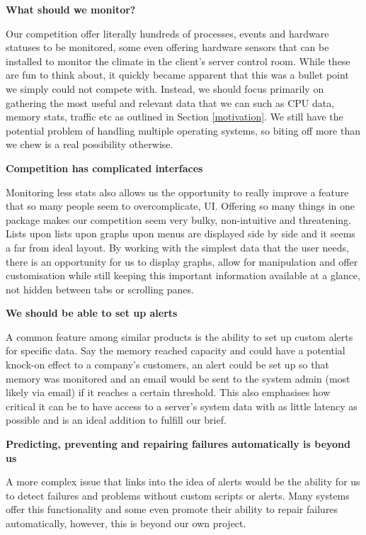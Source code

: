 \documentclass{l3proj}
\begin{document}
\textbf{What should we monitor?}

Our competition offer literally hundreds of processes, events and hardware statuses to be monitored, some even offering hardware sensors that can be installed to monitor the climate in the client's server control room. While these are fun to think about, it quickly became apparent that this was a bullet point we simply could not compete with. Instead, we should focus primarily on gathering the most useful and relevant data that we can such as CPU data, memory stats, traffic etc as outlined in Section \ref{motivation}. We still have the potential problem of handling multiple operating systems, so biting off more than we chew is a real possibility otherwise.

\textbf{Competition has complicated interfaces}

Monitoring less stats also allows us the opportunity to really improve a feature that so many people seem to overcomplicate, UI. Offering so many things in one package makes our competition seem very bulky, non-intuitive and threatening. Lists upon lists upon graphs upon menus are displayed side by side and it seems a far from ideal layout. By working with the simplest data that the user needs, there is an opportunity for us to display graphs, allow for manipulation and offer customisation while still keeping this important information available at a glance, not hidden between tabs or scrolling panes.

\textbf{We should be able to set up alerts}

A common feature among similar products is the ability to set up custom alerts for specific data. Say the memory reached capacity and could have a potential knock-on effect to a company's customers, an alert could be set up so that memory was monitored and an email would be sent to the system admin (most likely via email) if it reaches a certain threshold. This also emphasises how critical it can be to have access to a server's system data with as little latency as possible and is an ideal addition to fulfill our brief.

\textbf{Predicting, preventing and repairing failures automatically is beyond us}

A more complex issue that links into the idea of alerts would be the ability for us to detect failures and problems without custom scripts or alerts. Many systems offer this functionality and some even promote their ability to repair failures automatically, however, this is beyond our own project.
\end{document}
